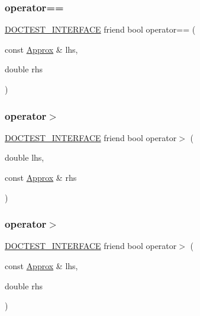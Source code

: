 \subsubsection{\texorpdfstring{operator==}{operator==}\hspace{0.1cm}{\footnotesize\ttfamily [2/2]}}
{\footnotesize\ttfamily \hyperlink{doctest_8h_a9c16ffc635ec47f07797d21ede26b1a5}{D\+O\+C\+T\+E\+S\+T\+\_\+\+I\+N\+T\+E\+R\+F\+A\+CE} friend bool operator== (\begin{DoxyParamCaption}\item[{const \hyperlink{classdoctest_1_1_approx}{Approx} \&}]{lhs,  }\item[{double}]{rhs }\end{DoxyParamCaption})\hspace{0.3cm}{\ttfamily [friend]}}

\mbox{\label{classdoctest_1_1_approx_a97a6e92b9c9dacc0adb2f76f9faf2924}} 
\subsubsection{\texorpdfstring{operator$>$}{operator>}\hspace{0.1cm}{\footnotesize\ttfamily [1/2]}}
{\footnotesize\ttfamily \hyperlink{doctest_8h_a9c16ffc635ec47f07797d21ede26b1a5}{D\+O\+C\+T\+E\+S\+T\+\_\+\+I\+N\+T\+E\+R\+F\+A\+CE} friend bool operator$>$ (\begin{DoxyParamCaption}\item[{double}]{lhs,  }\item[{const \hyperlink{classdoctest_1_1_approx}{Approx} \&}]{rhs }\end{DoxyParamCaption})\hspace{0.3cm}{\ttfamily [friend]}}

\mbox{\label{classdoctest_1_1_approx_a12a93e1726180db4091cb2e3b8ba5e30}} 
\subsubsection{\texorpdfstring{operator$>$}{operator>}\hspace{0.1cm}{\footnotesize\ttfamily [2/2]}}
{\footnotesize\ttfamily \hyperlink{doctest_8h_a9c16ffc635ec47f07797d21ede26b1a5}{D\+O\+C\+T\+E\+S\+T\+\_\+\+I\+N\+T\+E\+R\+F\+A\+CE} friend bool operator$>$ (\begin{DoxyParamCaption}\item[{const \hyperlink{classdoctest_1_1_approx}{Approx} \&}]{lhs,  }\item[{double}]{rhs }\end{DoxyParamCaption})\hspace{0.3cm}{\ttfamily [friend]}}

